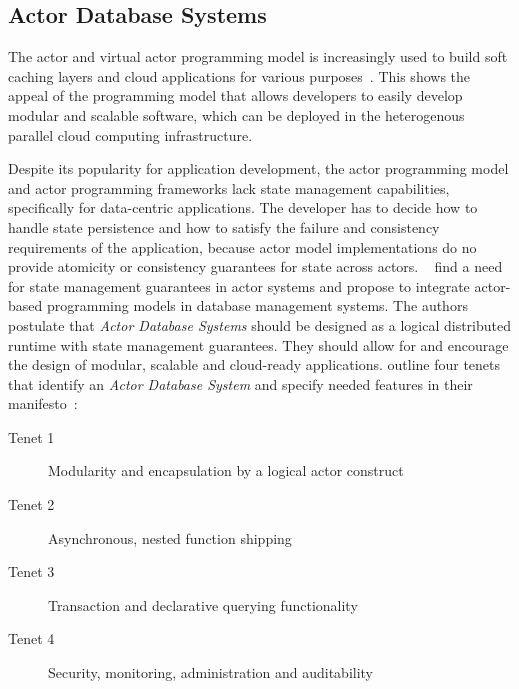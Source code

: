 

  \subsection{Actor Database Systems}
  The actor and virtual actor programming model is increasingly used to build soft caching layers and cloud applications for various purposes~\cite{erlang_uses,akka_uses,orleans_uses}.
  This shows the appeal of the programming model that allows developers to easily develop modular and scalable software, which can be deployed in the heterogenous parallel cloud computing infrastructure.
  
  Despite its popularity for application development, the actor programming model and actor programming frameworks lack state management capabilities, specifically for data-centric applications.
  The developer has to decide how to handle state persistence and how to satisfy the failure and consistency requirements of the application, because actor model implementations do no provide atomicity or consistency guarantees for state across actors.
  \citeauthor{manifesto}~\cite{manifesto} find a need for state management guarantees in actor systems and propose to integrate actor-based programming models in database management systems.
  The authors postulate that \textit{Actor Database Systems} should be designed as a logical distributed runtime with state management guarantees.
  They should allow for and encourage the design of modular, scalable and cloud-ready applications.
  \citeauthor{manifesto} outline four tenets that identify an \textit{Actor Database System} and specify needed features in their manifesto~\cite{manifesto}:
  \begin{description}
    \item[Tenet 1] Modularity and encapsulation by a logical actor construct
    \item[Tenet 2] Asynchronous, nested function shipping
    \item[Tenet 3] Transaction and declarative querying functionality
    \item[Tenet 4] Security, monitoring, administration and auditability
  \end{description}

